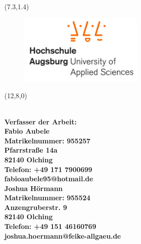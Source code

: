 
\thispagestyle{empty}\null

\begin{textblock}{10}(7.3,1.4)
	\begin{figure}[h]
		\centering
		\includegraphics[width=0.55\textwidth]{figures/hsa_logo.pdf}
	\end{figure}
\end{textblock}


\begin{textblock}{20}(12,8,0)
	\begin{flushleft}
		\noindent
		\footnotesize
		\textsf
		{	
			\textbf
			{\\
				Verfasser der Arbeit:\\
				\vspace{6pt}
				Fabio Aubele\\
				Matrikelnummer: 955257\\
				Pfarrstraße 14a\\
				82140 Olching\\
				Telefon: +49 171 7900699\\
				fabioaubele95@hotmail.de\\
				\vspace{6pt}
				Joshua Hörmann\\				
				Matrikelnummer: 955524\\
				Anzengruberstr. 9\\
				82140 Olching\\
				Telefon: +49 151 46160769\\
				joshua.hoermann@feike-allgaeu.de\\
			}
		}
	\end{flushleft}
\end{textblock}

